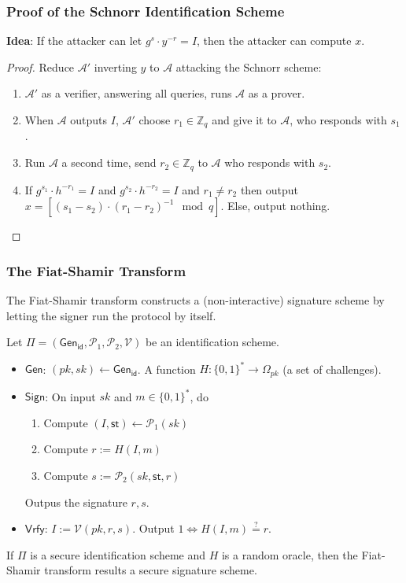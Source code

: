 \begin{frame}\frametitle{Proof of the Schnorr Identification Scheme}
\textbf{Idea}: If the attacker can let $g^s \cdot y^{-r} = I$, then the attacker can compute $x$.
\begin{proof}
Reduce $\mathcal{A}'$ inverting $y$ to $\mathcal{A}$ attacking the Schnorr scheme:
\begin{enumerate}
\item $\mathcal{A}'$ as a verifier, answering all queries, runs $\mathcal{A}$ as a prover.
\item When $\mathcal{A}$ outputs $I$, $\mathcal{A}'$ choose $r_1 \in \mathbb{Z}_q$ and give it to $\mathcal{A}$, who responds with $s_1$.
\item Run $\mathcal{A}$ a second time, send $r_2 \in \mathbb{Z}_q$ to  $\mathcal{A}$ who responds with $s_2$. 
\item If $g^{s_1} \cdot h^{-r_1} = I$ and $g^{s_2} \cdot h^{-r_2} = I$ and $r_1 \neq r_2$ then output $x = [ (s_1 - s_2)\cdot (r_1 - r_2)^{-1} \mod q]$. Else, output nothing.
\end{enumerate}
\end{proof}
\end{frame}

\begin{frame}\frametitle{The Fiat-Shamir Transform}
The Fiat-Shamir transform  constructs a (non-interactive) signature scheme by letting the signer run the protocol by itself.
\begin{construction}
Let $\Pi = (\mathsf{Gen}_{\mathsf{id}}, \mathcal{P}_1, \mathcal{P}_2, \mathcal{V})$ be an identification scheme.
\begin{itemize}
\item $\mathsf{Gen}$: $(pk, sk) \gets \mathsf{Gen}_{\mathsf{id}}$. A function $H : \{0,1\}^* \to \Omega_{pk}$ (a set of challenges).
\item $\mathsf{Sign}$: On input $sk$ and $m \in \{0,1\}^*$, do
\begin{enumerate}
\item Compute $(I, \mathsf{st}) \gets \mathcal{P}_1(sk)$
\item Compute $r := H(I, m)$
\item Compute $s := \mathcal{P}_2(sk, \mathsf{st}, r)$
\end{enumerate}
Outpus the signature $r, s$.
\item $\mathsf{Vrfy}$: $I := \mathcal{V}(pk, r, s)$. Output $1 \iff H(I, m) \overset{?}{=} r.$
\end{itemize}
\end{construction}
\begin{theorem}
If $\Pi$ is a secure identification scheme and $H$ is a random oracle, then the Fiat-Shamir transform results a secure signature scheme.
\end{theorem}
\end{frame}

